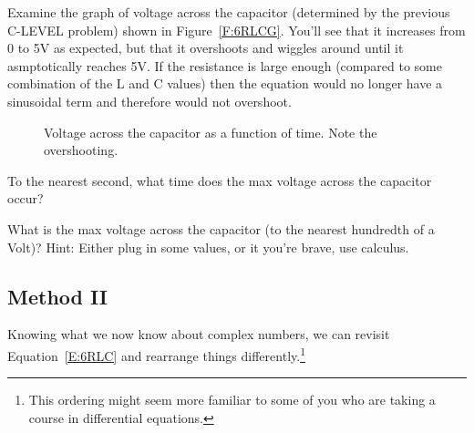 Examine the graph of voltage across the capacitor (determined by the previous C-LEVEL problem) shown in Figure~\ref{F:6RLCG}. You'll see that it increases from 0 to 5V as expected, but that it overshoots and wiggles around until it asmptotically reaches 5V. If the resistance is large enough (compared to some combination of the L and C values) then the equation would no longer have a sinusoidal term and therefore would not overshoot.

\begin{figure}[H]
\begin{center}
\caption{Voltage across the capacitor as a function of time. Note the overshooting.}
\label{F:6RLCG3}
\end{center}
\end{figure}

\begin{alevel}
To the nearest second, what time does the max voltage across the capacitor occur?
\end{alevel}

\begin{clevel}
What is the max voltage across the capacitor (to the nearest hundredth of a Volt)? Hint: Either plug in some values, or it you're brave, use calculus.
\end{clevel}

\subsection{Method II}
Knowing what we now know about complex numbers, we can revisit Equation~\eqref{E:6RLC} and rearrange things differently.\footnote{This ordering might seem more familiar to some of you who are taking a course in differential equations.}

